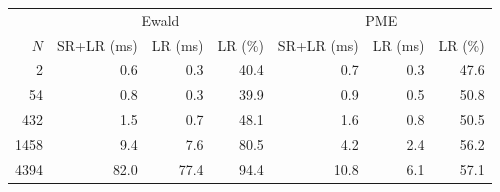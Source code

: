 \begin{tabular}{r | r r r | r r r}
\toprule
  \multicolumn{1}{c}{} & \multicolumn{3}{c}{Ewald} & \multicolumn{3}{c}{PME} \\ 
           $N$  &      SR+LR (ms)  &         LR (ms)  &         LR (\%)  &      SR+LR (ms)  &         LR (ms)  &         LR (\%) \\ 
\midrule
             2  &       \num{0.6}  &       \num{0.3}  &      \num{40.4}  &       \num{0.7}  &       \num{0.3}  &      \num{47.6} \\ 
            54  &       \num{0.8}  &       \num{0.3}  &      \num{39.9}  &       \num{0.9}  &       \num{0.5}  &      \num{50.8} \\ 
           432  &       \num{1.5}  &       \num{0.7}  &      \num{48.1}  &       \num{1.6}  &       \num{0.8}  &      \num{50.5} \\ 
          1458  &       \num{9.4}  &       \num{7.6}  &      \num{80.5}  &       \num{4.2}  &       \num{2.4}  &      \num{56.2} \\ 
          4394  &      \num{82.0}  &      \num{77.4}  &      \num{94.4}  &      \num{10.8}  &       \num{6.1}  &      \num{57.1} \\ 

\end{tabular}

